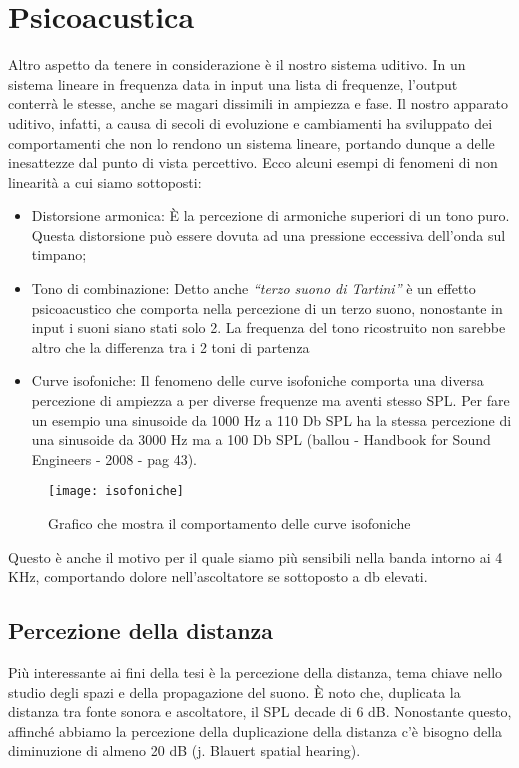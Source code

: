 \section{Psicoacustica}

Altro aspetto da tenere in considerazione è il nostro sistema uditivo. In un sistema lineare in frequenza data in input una lista di frequenze, l’output conterrà le stesse, anche se magari dissimili in ampiezza e fase.
Il nostro apparato uditivo, infatti, a causa di secoli di evoluzione e cambiamenti ha sviluppato dei comportamenti che non lo rendono un sistema lineare, portando dunque a delle inesattezze dal punto di vista percettivo.
Ecco alcuni esempi di fenomeni di non linearità a cui siamo sottoposti:

\begin{itemize}
\item Distorsione armonica:
È la percezione di armoniche superiori di un tono puro. Questa distorsione può essere dovuta ad una pressione eccessiva dell’onda sul timpano;
\item Tono di combinazione:
Detto anche \textit{“terzo suono di Tartini”} è un effetto psicoacustico che comporta nella percezione di un terzo suono, nonostante in input i suoni siano stati solo 2.
La frequenza del tono ricostruito non sarebbe altro che la differenza tra i 2 toni di partenza
\item Curve isofoniche:
Il fenomeno delle curve isofoniche comporta una diversa percezione di ampiezza a per diverse frequenze ma aventi stesso SPL. Per fare un esempio una sinusoide da 1000 Hz a 110 Db SPL ha la stessa percezione di una sinusoide da 3000 Hz ma a 100 Db SPL (ballou - Handbook for Sound Engineers - 2008 - pag 43).
\end{itemize}

\begin{figure}[h]
\centering
\texttt{[image: isofoniche]}
\caption{Grafico che mostra il comportamento delle curve isofoniche}
\label{fig:isofoniche}
\end{figure}

Questo è anche il motivo per il quale siamo più sensibili nella banda intorno ai 4 KHz, comportando dolore nell’ascoltatore se sottoposto a db elevati.

\subsection{Percezione della distanza}

Più interessante ai fini della tesi è la percezione della distanza, tema chiave nello studio degli spazi e della propagazione del suono.
È noto che, duplicata la distanza tra fonte sonora e ascoltatore, il SPL decade di 6 dB.
Nonostante questo, affinché abbiamo la percezione della duplicazione della distanza c’è bisogno della diminuzione di almeno 20 dB (j. Blauert spatial hearing).


